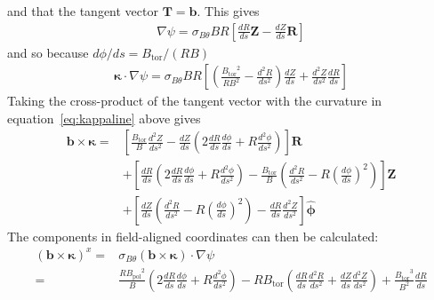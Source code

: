 \documentclass[12pt]{article}
\newcommand{\sbt}{\ensuremath{\sigma_{B\theta}}}
\newcommand{\dd}[2]{\ensuremath{\frac{d #1}{d #2}}}
\newcommand{\ddd}[2]{\ensuremath{\frac{d^2 #1}{d #2^2}}}
\newcommand{\Bp}{\ensuremath{B_{\text{pol}}}}
\newcommand{\Bt}{\ensuremath{B_{\text{tor}}}}
\newcommand{\ve}[1]{\ensuremath{\boldsymbol{#1}}}
\newcommand{\hv}[1]{\hat{\ve{#1}}}
\newcommand{\bvec}{\ve{b}}
\newcommand{\kvec}{\ve{\kappa}}
\newcommand{\phivec}{\ensuremath{\hv{\phi}}}
\begin{document}
%
and that the tangent vector $\ve{T} = \bvec$. This gives
%
\begin{align}
\nabla\psi = \sbt BR\left[\frac{dR}{ds}\ve{Z} - \frac{dZ}{ds}\ve{R}\right]
\label{eq:flinegradpsi}
\end{align}
%
and so because $d\phi / ds = \Bt / \left(RB\right)$
%
\begin{align}
\kvec\cdot\nabla\psi = \sbt BR\left[ \left( \frac{\Bt^2}{RB^2} -
\ddd{R}{s}\right)\dd{Z}{s} + \ddd{Z}{s}\frac{dR}{ds} \right]
\label{eq:flinekappsi}
\end{align}
%
Taking the cross-product of the tangent vector with the curvature in
equation~\ref{eq:kappaline} above gives
%
\begin{align*}
  \bvec \times\kvec =& \left[\frac{\Bt}{B}\ddd{Z}{s} -
\dd{Z}{s}\left(2\dd{R}{s}\dd{\phi}{s} + R\ddd{\phi}{s}\right)\right]\ve{R} \\
  &+ \left[\dd{R}{s}\left(2\dd{R}{s}\dd{\phi}{s} + R\ddd{\phi}{s}\right) -
\frac{\Bt}{B}\left(\ddd{R}{s} -
R\left(\dd{\phi}{s}\right)^2\right)\right]\ve{Z} \\
  &+ \left[\dd{Z}{s}\left(\ddd{R}{s} - R\left(\dd{\phi}{s}\right)^2\right) -
\dd{R}{s}\ddd{Z}{s}\right]\phivec
\end{align*}
%
The components in field-aligned coordinates can then be calculated:
%
\begin{align*}
\left(\bvec\times\kvec\right)^x =&
\sbt\left(\bvec\times\kvec\right)\cdot\nabla\psi \\
=& \frac{R\Bp^2}{B}\left(2\dd{R}{s}\dd{\phi}{s} + R\ddd{\phi}{s}\right) -
R\Bt\left(\dd{R}{s}\ddd{R}{s} + \dd{Z}{s}\ddd{Z}{s}\right) +
\frac{\Bt^3}{B^2}\dd{R}{s}
\end{align*}
\end{document}
